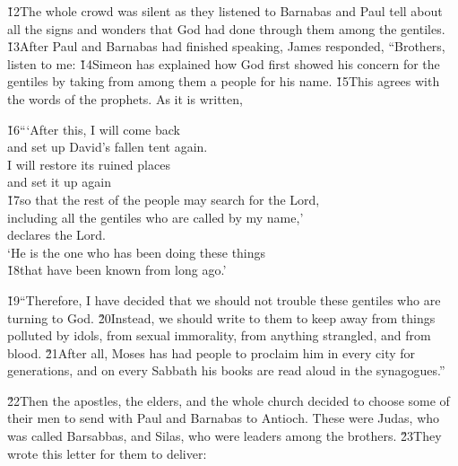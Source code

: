 \v{12}The whole crowd was silent as they listened to Barnabas and Paul tell about all the signs and wonders that God had done through them among the gentiles. \v{13}After Paul and Barnabas had finished speaking, James responded, ``Brothers, listen to me: \v{14}Simeon has explained how God first showed his concern for the gentiles by taking from among them a people for his name. \v{15}This agrees with the words of the prophets. As it is written,

\begin{poetry}
\poeml \v{16}```After this, I will come back \\
\poemll    and set up David's fallen tent again. \\
\poeml I will restore its ruined places \\
\poemll    and set it up again \\
\poeml \v{17}so that the rest of the people may search for the Lord, \\
\poemll    including all the gentiles who are called by my name,' \\
\poemlll       declares the Lord. \\
\poeml `He is the one who has been doing these things \\
\poemll    \v{18}that have been known from long ago.'
\end{poetry}

\v{19}``Therefore, I have decided that we should not trouble these gentiles who are turning to God. \v{20}Instead, we should write to them to keep away from things polluted by idols, from sexual immorality, from anything strangled, and from blood. \v{21}After all, Moses has had people to proclaim him in every city for generations, and on every Sabbath his books are read aloud in the synagogues.''

\v{22}Then the apostles, the elders, and the whole church decided to choose some of their men to send with Paul and Barnabas to Antioch. These were Judas, who was called Barsabbas, and Silas, who were leaders among the brothers. \v{23}They wrote this letter for them to deliver:

